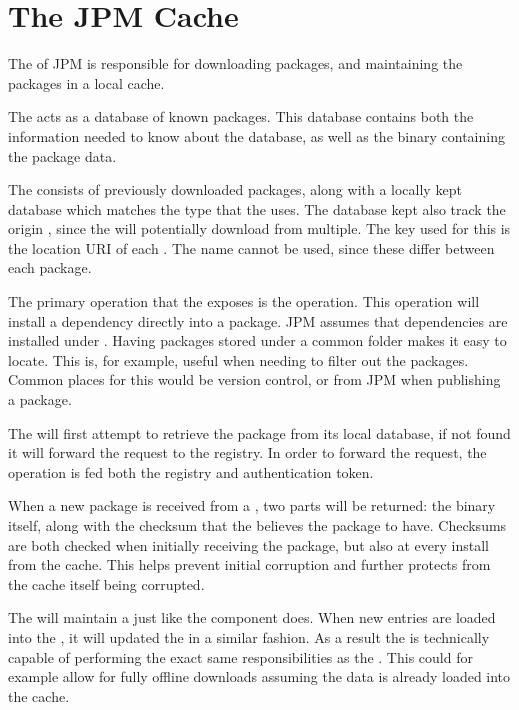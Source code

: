 \section{The JPM Cache}
\label{sec:cache}

The \cache of JPM is responsible for downloading packages, and maintaining the
packages in a local cache.

The \cache acts as a database of known packages. This database contains
both the information needed to know about the database, as well as the binary
containing the package data.

The \cache consists of previously downloaded packages, along with a
locally kept database which matches the type that the \registry uses. The
database kept also track the origin \registry, since the \cache will
potentially download from multiple. The key used for this is the location URI
of each \registry. The name cannot be used, since these differ between each
package.

The primary operation that the \cache exposes is the 
operation. This operation will install a dependency directly into a package.
JPM assumes that dependencies are installed under
. Having packages stored under a common
folder makes it easy to locate. This is, for example, useful when needing to
filter out the packages. Common places for this would be version control, or
from JPM when publishing a package.

The \cache will first attempt to retrieve the package from its local database,
if not found it will forward the request to the registry. In order to
forward the request, the operation is fed both the registry and
authentication token.

When a new package is received from a \registry, two parts will be returned:
the binary itself, along with the checksum that the \registry believes the
package to have. Checksums are both checked when initially receiving the
package, but also at every install from the cache. This helps prevent initial
corruption and further protects from the cache itself being corrupted.

The \cache will maintain a \regdb just like the \registry component does. When
new entries are loaded into the \cache, it will updated the \regdb in a similar
fashion. As a result the \cache is technically capable of performing the exact
same responsibilities as the \registry. This could for example allow for fully
offline downloads assuming the data is already loaded into the cache.

